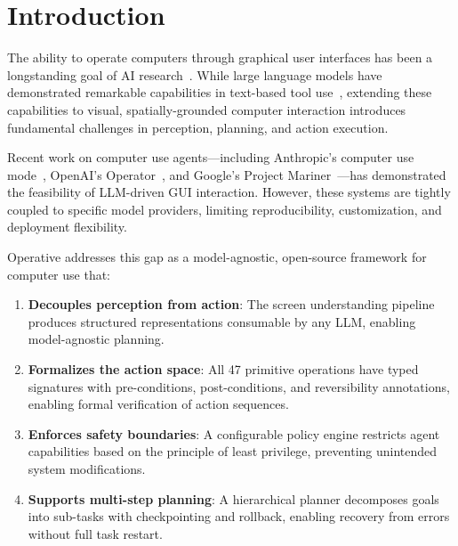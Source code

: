 \section{Introduction}


The ability to operate computers through graphical user interfaces has been a longstanding goal of AI research~\cite{shi2017world}. While large language models have demonstrated remarkable capabilities in text-based tool use~\cite{schick2024toolformer}, extending these capabilities to visual, spatially-grounded computer interaction introduces fundamental challenges in perception, planning, and action execution.

Recent work on computer use agents---including Anthropic's computer use mode~\cite{anthropic2024computer}, OpenAI's Operator~\cite{openai2025operator}, and Google's Project Mariner~\cite{google2024mariner}---has demonstrated the feasibility of LLM-driven GUI interaction. However, these systems are tightly coupled to specific model providers, limiting reproducibility, customization, and deployment flexibility.

Operative addresses this gap as a model-agnostic, open-source framework for computer use that:

\begin{enumerate}[leftmargin=*]
    \item \textbf{Decouples perception from action}: The screen understanding pipeline produces structured representations consumable by any LLM, enabling model-agnostic planning.
    \item \textbf{Formalizes the action space}: All 47 primitive operations have typed signatures with pre-conditions, post-conditions, and reversibility annotations, enabling formal verification of action sequences.
    \item \textbf{Enforces safety boundaries}: A configurable policy engine restricts agent capabilities based on the principle of least privilege, preventing unintended system modifications.
    \item \textbf{Supports multi-step planning}: A hierarchical planner decomposes goals into sub-tasks with checkpointing and rollback, enabling recovery from errors without full task restart.
\end{enumerate}


